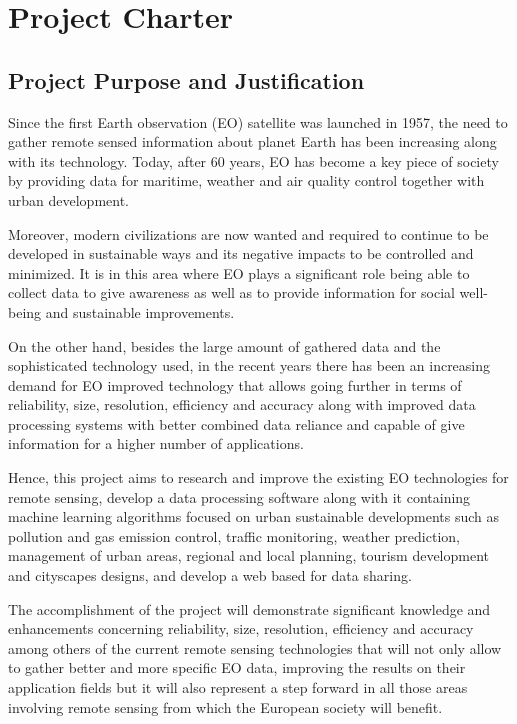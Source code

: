\chapter{Project Charter}

\section{Project Purpose and Justification}

Since the first Earth observation (EO) satellite was launched in 1957, the need to gather remote sensed information about planet Earth has been increasing along with its technology. Today, after 60 years, EO has become a key piece of society by providing data for maritime, weather and air quality control together with urban development. 

Moreover, modern civilizations are now wanted and required to continue to be developed in sustainable ways and its negative impacts to be controlled and minimized. It is in this area where EO plays a significant role being able to collect data to give awareness as well as to provide information for social well-being and sustainable improvements.

On the other hand, besides the large amount of gathered data and the sophisticated technology used, in the recent years there has been an increasing demand for EO improved technology that allows going further in terms of reliability, size, resolution, efficiency and accuracy along with improved data processing systems with better combined data reliance and capable of give information for a higher number of applications. 


Hence, this project aims to research and improve the existing EO technologies for remote sensing, develop a data processing software along with it containing machine learning algorithms focused on urban sustainable developments such as pollution and gas emission control, traffic monitoring, weather prediction, management of urban areas, regional and local planning, tourism development and cityscapes designs, and develop a web based for data sharing. 


The accomplishment of the project will demonstrate significant knowledge and enhancements concerning reliability, size, resolution, efficiency and accuracy among others of the current remote sensing technologies that will not only allow to gather better and more specific EO data, improving the results on their application fields but it will also represent a step forward in all those areas involving remote sensing from which the European society will benefit. 

